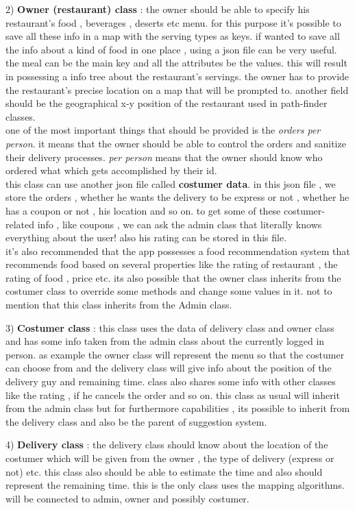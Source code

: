 \documentclass[12pt]{article}
\begin{document}
2) \textbf{Owner (restaurant) class} : the owner should be able to specify his restaurant's food , beverages , deserts etc menu. for this purpose it's possible to save all these info in a map with the serving types as keys.
if wanted to save all the info about a kind of food in one place , using a json file can be very useful. the meal can be the main key and all the attributes be the values. this will result in possessing a info tree about the restaurant's servings.
the owner has to provide the restaurant's precise location on a map that will be prompted to. another field should be the geographical x-y position of the restaurant used in path-finder classes. \\
one of the most important things that should be provided is the \emph{orders per person}. it means that the owner should be able to control the orders and sanitize their delivery processes.
\emph{per person} means that the owner should know who ordered what which gets accomplished by their id. \\
this class can use another json file called \textbf{costumer data}. in this json file , we store the orders , whether he wants the delivery to be express or not , whether he has a coupon or not , his location and so on.
to get some of these costumer-related info , like coupons , we can ask the admin class that literally knows everything about the user!
also his rating can be stored in this file. \\ it's also recommended that the app possesses a food recommendation system that recommends food based on several properties like the rating of restaurant , the rating of food , price etc. 
its also possible that the owner class inherits from the costumer class to override some methods and change some values in it. not to mention that this class inherits from the Admin class.

3) \textbf{Costumer class} : this class uses the data of delivery class and owner class and has some info taken from the admin class about the currently logged in person.
as example the owner class will represent the menu so that the costumer can choose from and the delivery class will give info about the position of the delivery guy and remaining time.
class also shares some info with other classes like the rating , if he cancels the order and so on. this class as usual will inherit from the admin class but for furthermore capabilities , its possible to inherit from the delivery class and also be the parent of suggestion system.

4) \textbf{Delivery class} : the delivery class should know about the location of the costumer which will be given from the owner , the type of delivery (express or not) etc. this class also should be able to estimate the time and also should represent the remaining time.
this is the only class uses the mapping algorithms. will be connected to admin, owner and possibly costumer. 
\end{document}
